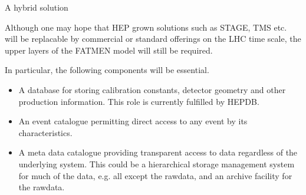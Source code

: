 \begin{slide}
\begin{center}A hybrid solution\end{center}

Although one may hope that HEP grown solutions such as
STAGE, TMS etc. will be replacable by commercial or
standard offerings on the LHC time scale, the upper
layers of the FATMEN model will still be required.

In particular, the following components will be essential.

\begin{itemize}
\item
A database for storing calibration constants, detector
geometry and other production information. This role is
currently fulfilled by HEPDB.
\item
An event catalogue permitting direct access to any event
by its characteristics.
\item
A meta data catalogue providing transparent access to data
regardless of the underlying system. This could be a hierarchical
storage management system for much of the data, e.g. all except
the rawdata, and an archive facility for the rawdata.
\end{itemize}
\end{slide}


